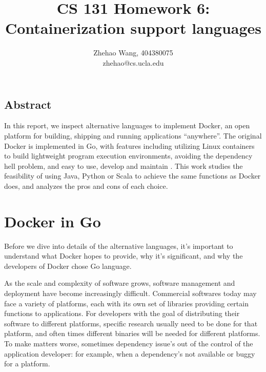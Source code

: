 \documentclass[letterpaper,twocolumn,10pt]{article}
\begin{document}
\date{}

\title{\Large \bf CS 131 Homework 6: Containerization support languages}

\author{
{\rm Zhehao Wang, 404380075}\\
zhehao@cs.ucla.edu
} %

\maketitle

\thispagestyle{empty}

\subsection*{Abstract}

In this report, we inspect alternative languages to implement Docker, an open platform for building, shipping and running applications ``anywhere''. The original Docker is implemented in Go, with features including utilizing Linux containers to build lightweight program execution environments, avoiding the dependency hell problem, and easy to use, develop and maintain \cite{DockerSite}. This work studies the feasibility of using Java, Python or Scala to achieve the same functions as Docker does, and analyzes the pros and cons of each choice.

\section{Docker in Go}

Before we dive into details of the alternative languages, it's important to understand what Docker hopes to provide, why it's significant, and why the developers of Docker chose Go language.

As the scale and complexity of software grows, software management and deployment have become increasingly difficult. Commercial softwares today may face a variety of platforms, each with its own set of libraries providing certain functions to applications. For developers with the goal of distributing their software to different platforms, specific research usually need to be done for that platform, and often times different binaries will be needed for different platforms. To make matters worse, sometimes dependency issue's out of the control of the application developer: for example, when a dependency's not available or buggy for a platform.
\end{document}
